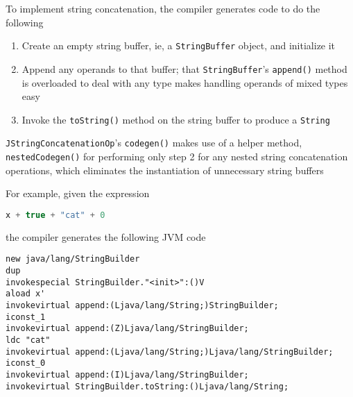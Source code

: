 \documentclass[8pt,a4paper,compress]{beamer}
\begin{document}
\begin{frame}[fragile]
\pause

To implement string concatenation, the compiler generates code to do the following
\begin{enumerate}
\pause
\item Create an empty string buffer, ie, a \lstinline{StringBuffer} object, and initialize it
\pause
\item Append any operands to that buffer; that \lstinline{StringBuffer}'s \lstinline{append()} method is overloaded to deal with any type makes handling operands of mixed types easy
\pause
\item Invoke the \lstinline{toString()} method on the string buffer to produce a \lstinline{String}
\end{enumerate}

\pause
\bigskip

\lstinline{JStringConcatenationOp}'s \lstinline{codegen()} makes use of a helper method, \lstinline{nestedCodegen()} for performing only step 2 for any nested string concatenation operations, which eliminates the instantiation of unnecessary string buffers

\pause
\bigskip

For example, given the \jmm expression
\begin{lstlisting}[language=Java,style=focusin]
x + true + "cat" + 0
\end{lstlisting}
the compiler generates the following JVM code
\begin{lstlisting}[language={},style=focusin]
new java/lang/StringBuilder
dup
invokespecial StringBuilder."<init>":()V
aload x'
invokevirtual append:(Ljava/lang/String;)StringBuilder;
iconst_1
invokevirtual append:(Z)Ljava/lang/StringBuilder;
ldc "cat"
invokevirtual append:(Ljava/lang/String;)Ljava/lang/StringBuilder;
iconst_0
invokevirtual append:(I)Ljava/lang/StringBuilder;
invokevirtual StringBuilder.toString:()Ljava/lang/String;
\end{lstlisting}
\end{frame}
\end{document}
